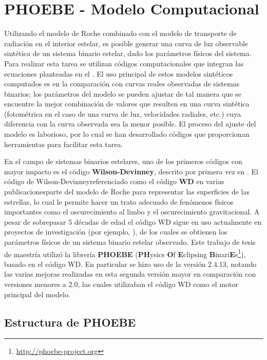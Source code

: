 \chapter{PHOEBE - Modelo Computacional}

Utilizando el modelo de Roche combinado con el modelo de transporte de radiación
en el interior estelar, es posible generar una curva de luz observable sintética
de un sistema binario estelar, dado los parámetros físicos del sistema. Para
realizar esta tarea se utilizan códigos computacionales que integran las
ecuaciones planteadas en el . El uso
principal de estos modelos sintéticos computados es en la comparación con curvas
reales observadas de sistemas binarios; los parámetros del modelo se pueden
ajustar de tal manera que se encuentre la mejor combinación de valores que
resulten en una curva sintética (fotométrica en el caso de una curva de luz,
velocidades radiales, etc.) cuya diferencia con la curva observada sea la menor
posible. El proceso del ajuste del modelo es laborioso, por lo cual se han
desarrollado códigos que proporcionan herramientas para facilitar esta tarea.

En el campo de sistemas binarios estelares, uno de los primeros códigos con
mayor impacto es el código \textbf{Wilson-Devinney}, descrito por primera vez en
. El
código de Wilson-Devinney\textemdash referenciado como el código \textbf{WD} en
varias publicaciones\textemdash parte del modelo de Roche para representar las
superficies de las estrellas, lo cual le permite hacer un trato adecuado de
fenómenos físicos importantes como el oscurecimiento al limbo y el
oscurecimiento gravitacional. A pesar de sobrepasar 5 décadas de edad el código
WD sigue en uso actualmente en proyectos de investigación (por ejemplo,
), de los cuales se
obtienen los parámetros físicos de un sistema binario estelar observado. Este
trabajo de tesis de maestría utilizó la librería \textbf{PHOEBE}
(\textbf{PH}ysics \textbf{O}f \textbf{E}clipsing
\textbf{B}inari\textbf{E}s\footnote{\url{http://phoebe-project.org}}), basado en
el código WD. En particular se hizo uso de la versión 2.4.13, notando las varias
mejoras realizadas en esta segunda versión mayor en comparación con versiones
menores a 2.0, las cuales utilizaban el código WD como el motor principal del
modelo.

\section{Estructura de PHOEBE}

